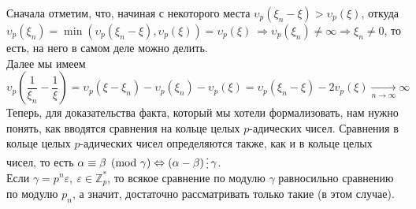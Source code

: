 \documentclass[11pt]{report}
\begin{document}
    Сначала отметим, что, начиная с некоторого места $ \upsilon_p{(\xi_n - \xi)} > \upsilon_p{(\xi)}$, откуда $ \upsilon_p{(\xi_n)} = \min( \upsilon_p{(\xi_n - \xi)}, \upsilon_p{(\xi)}) = \upsilon_p{(\xi)} \ \Rightarrow \upsilon_p{(\xi_n)} \neq \infty \Rightarrow \xi_n \neq 0$,
    то есть, на него в самом деле можно делить. \\

    Далее мы имеем
    \[ \upsilon_p{\left(\frac{1}{\xi_n} - \frac{1}{\xi} \right)} = \upsilon_p{(\xi - \xi_n)} - \upsilon_p{(\xi_n)} - \upsilon_p{(\xi)} = \upsilon_p{(\xi_n - \xi)} - 2v_p(\xi) \xrightarrow[n \to \infty]{} \infty \]
    Теперь, для доказательства факта, который мы хотели формализовать, нам нужно понять, как вводятся сравнения на кольце целых $p$-адических чисел.
    Сравнения в кольце целых $p$-адических чисел определяются также, как и в кольце целых чисел, то есть $\alpha \equiv \beta \pmod{\gamma} \Leftrightarrow (\alpha - \beta) \divisible \gamma$.\\

    Если $\gamma = p^n \varepsilon, \ \varepsilon \in \mathbb{Z}_p^{*}$, то всякое сравнение по модулю $\gamma$ равносильно сравнению по модулю $p_n$, а значит,
    достаточно рассматривать только такие (в этом случае).
\end{document}
